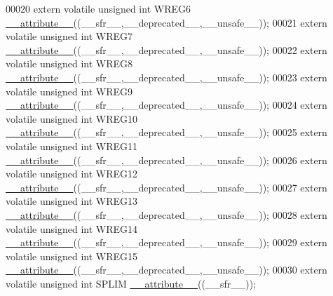 \begin{DoxyCode}
00020 \textcolor{keyword}{extern} \textcolor{keyword}{volatile} \textcolor{keywordtype}{unsigned} \textcolor{keywordtype}{int}  WREG6 \hyperlink{a00009_a493c46f03454991ccc5aa7a6e1dfb2a7}{\_\_attribute\_\_}((\_\_sfr\_\_,\_\_deprecated\_\_,\_\_unsafe\_\_));
00021 \textcolor{keyword}{extern} \textcolor{keyword}{volatile} \textcolor{keywordtype}{unsigned} \textcolor{keywordtype}{int}  WREG7 \hyperlink{a00009_a493c46f03454991ccc5aa7a6e1dfb2a7}{\_\_attribute\_\_}((\_\_sfr\_\_,\_\_deprecated\_\_,\_\_unsafe\_\_));
00022 \textcolor{keyword}{extern} \textcolor{keyword}{volatile} \textcolor{keywordtype}{unsigned} \textcolor{keywordtype}{int}  WREG8 \hyperlink{a00009_a493c46f03454991ccc5aa7a6e1dfb2a7}{\_\_attribute\_\_}((\_\_sfr\_\_,\_\_deprecated\_\_,\_\_unsafe\_\_));
00023 \textcolor{keyword}{extern} \textcolor{keyword}{volatile} \textcolor{keywordtype}{unsigned} \textcolor{keywordtype}{int}  WREG9 \hyperlink{a00009_a493c46f03454991ccc5aa7a6e1dfb2a7}{\_\_attribute\_\_}((\_\_sfr\_\_,\_\_deprecated\_\_,\_\_unsafe\_\_));
00024 \textcolor{keyword}{extern} \textcolor{keyword}{volatile} \textcolor{keywordtype}{unsigned} \textcolor{keywordtype}{int}  WREG10 \hyperlink{a00009_a493c46f03454991ccc5aa7a6e1dfb2a7}{\_\_attribute\_\_}((\_\_sfr\_\_,\_\_deprecated\_\_,\_\_unsafe\_\_));
00025 \textcolor{keyword}{extern} \textcolor{keyword}{volatile} \textcolor{keywordtype}{unsigned} \textcolor{keywordtype}{int}  WREG11 \hyperlink{a00009_a493c46f03454991ccc5aa7a6e1dfb2a7}{\_\_attribute\_\_}((\_\_sfr\_\_,\_\_deprecated\_\_,\_\_unsafe\_\_));
00026 \textcolor{keyword}{extern} \textcolor{keyword}{volatile} \textcolor{keywordtype}{unsigned} \textcolor{keywordtype}{int}  WREG12 \hyperlink{a00009_a493c46f03454991ccc5aa7a6e1dfb2a7}{\_\_attribute\_\_}((\_\_sfr\_\_,\_\_deprecated\_\_,\_\_unsafe\_\_));
00027 \textcolor{keyword}{extern} \textcolor{keyword}{volatile} \textcolor{keywordtype}{unsigned} \textcolor{keywordtype}{int}  WREG13 \hyperlink{a00009_a493c46f03454991ccc5aa7a6e1dfb2a7}{\_\_attribute\_\_}((\_\_sfr\_\_,\_\_deprecated\_\_,\_\_unsafe\_\_));
00028 \textcolor{keyword}{extern} \textcolor{keyword}{volatile} \textcolor{keywordtype}{unsigned} \textcolor{keywordtype}{int}  WREG14 \hyperlink{a00009_a493c46f03454991ccc5aa7a6e1dfb2a7}{\_\_attribute\_\_}((\_\_sfr\_\_,\_\_deprecated\_\_,\_\_unsafe\_\_));
00029 \textcolor{keyword}{extern} \textcolor{keyword}{volatile} \textcolor{keywordtype}{unsigned} \textcolor{keywordtype}{int}  WREG15 \hyperlink{a00009_a493c46f03454991ccc5aa7a6e1dfb2a7}{\_\_attribute\_\_}((\_\_sfr\_\_,\_\_deprecated\_\_,\_\_unsafe\_\_));
00030 \textcolor{keyword}{extern} \textcolor{keyword}{volatile} \textcolor{keywordtype}{unsigned} \textcolor{keywordtype}{int}  SPLIM \hyperlink{a00009_a493c46f03454991ccc5aa7a6e1dfb2a7}{\_\_attribute\_\_}((\_\_sfr\_\_));

\end{DoxyCode}
